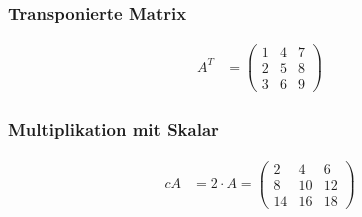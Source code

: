 \documentclass{article}
\begin{document}
\hfill
\begin{minipage}[t]{0.45\textwidth}
    \subsubsection*{Transponierte Matrix}
    \begin{align*}
    A^T &= \begin{pmatrix}
    1 & 4 & 7 \\
    2 & 5 & 8 \\
    3 & 6 & 9
    \end{pmatrix}
    \end{align*}

    \subsubsection*{Multiplikation mit Skalar}
    \begin{align*}
    cA &= 2 \cdot A = \begin{pmatrix}
    2 & 4 & 6 \\
    8 & 10 & 12 \\
    14 & 16 & 18
    \end{pmatrix}
    \end{align*}
\end{minipage}
\end{document}
